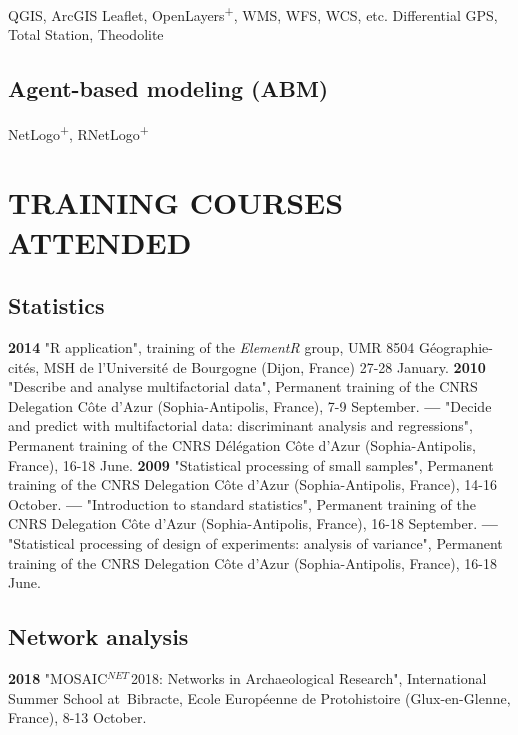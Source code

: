 \documentclass{article}
\begin{document}
QGIS, ArcGIS {\textbar} \textsf{Leaflet}, \textsf{OpenLayers\textsuperscript{+}}, WMS, WFS, WCS, etc. {\textbar} Differential GPS, Total Station, Theodolite

\subsection*{Agent-based modeling (ABM)}

NetLogo\textsuperscript{+}, \textsf{RNetLogo\textsuperscript{+}}

\section{TRAINING COURSES ATTENDED}

\subsection*{Statistics }

\textbf{2014 }"\textsf{R} application", training of the \textit{ElementR} group, UMR 8504 G\'{e}ographie-cit\'{e}s, MSH de l'Universit\'{e} de Bourgogne (Dijon, France) 27-28 January.
\smallbreak
\textbf{2010 }"Describe and analyse multifactorial data", Permanent training of the CNRS Delegation C\^{o}te d'Azur (Sophia-Antipolis, France), 7-9 September.
\smallbreak
\textbf{---  }"Decide and predict with multifactorial data: discriminant analysis and regressions", Permanent training of the CNRS D\'{e}l\'{e}gation C\^{o}te d'Azur (Sophia-Antipolis, France), 16-18 June.
\smallbreak
\textbf{2009 }"Statistical processing of small samples", Permanent training of the CNRS Delegation C\^{o}te d'Azur (Sophia-Antipolis, France), 14-16 October.
\smallbreak
\textbf{---  }"Introduction to standard statistics", Permanent training of the CNRS Delegation C\^{o}te d'Azur (Sophia-Antipolis, France), 16-18 September.
\textbf{---  }"Statistical processing of design of experiments: analysis of variance", Permanent training of the CNRS Delegation C\^{o}te d'Azur (Sophia-Antipolis, France), 16-18 June.
\smallbreak

\subsection*{Network analysis}

\textbf{2018 }"MOSAIC${}^{NET\ }$2018: Networks in Archaeological Research", International Summer School at~Bibracte, Ecole Europ\'{e}enne de Protohistoire (Glux-en-Glenne, France), 8-13 October.
\end{document}
